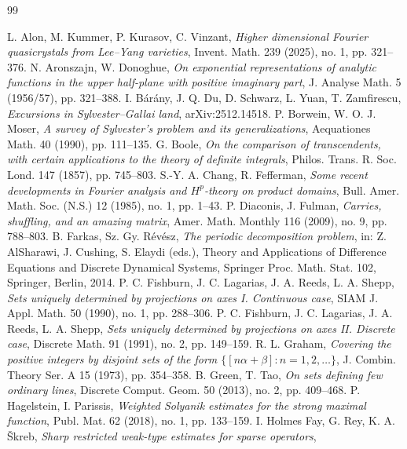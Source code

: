 \documentclass{article}
\begin{document}
	\begin{thebibliography}{99}

		{L. Alon, M. Kummer, P. Kurasov, C. Vinzant},
		{\it Higher dimensional Fourier quasicrystals from Lee--Yang varieties},
		Invent. Math. 239 (2025), no. 1, pp. 321--376.
		{N. Aronszajn, W. Donoghue},
		{\it On exponential representations of analytic functions in the upper half-plane with positive imaginary part},
		J. Analyse Math. 5 (1956/57), pp. 321--388.
		{I. B\'ar\'any, J. Q. Du, D. Schwarz, L. Yuan, T. Zamfirescu},
		{\it Excursions in Sylvester--Gallai land},
		arXiv:2512.14518.
		{P. Borwein, W. O. J. Moser},
		{\it A survey of Sylvester's problem and its generalizations},
		Aequationes Math. 40 (1990), pp. 111--135.
		{G. Boole},
		{\it On the comparison of transcendents, with certain applications to the theory of definite integrals},
		Philos. Trans. R. Soc. Lond. 147 (1857), pp. 745--803.
		{S.-Y. A. Chang, R. Fefferman},
		{\it Some recent developments in Fourier analysis and $H^p$-theory on product domains},
		Bull. Amer. Math. Soc. (N.S.) 12 (1985), no. 1, pp. 1--43.
		{P. Diaconis, J. Fulman},
		{\it Carries, shuffling, and an amazing matrix},
		Amer. Math. Monthly 116 (2009), no. 9, pp. 788--803.
		{B. Farkas, Sz. Gy. R\'ev\'esz},
		{\it The periodic decomposition problem},
		in: Z. AlSharawi, J. Cushing, S. Elaydi (eds.), Theory and Applications of Difference Equations and Discrete Dynamical Systems, Springer Proc. Math. Stat. 102, Springer, Berlin, 2014.
		{P. C. Fishburn, J. C. Lagarias, J. A. Reeds, L. A. Shepp},
		{\it Sets uniquely determined by projections on axes I. Continuous case},
		SIAM J. Appl. Math. 50 (1990), no. 1, pp. 288--306.
		{P. C. Fishburn, J. C. Lagarias, J. A. Reeds, L. A. Shepp},
		{\it Sets uniquely determined by projections on axes II. Discrete case},
		Discrete Math. 91 (1991), no. 2, pp. 149--159.
		{R. L. Graham},
		{\it Covering the positive integers by disjoint sets of the form $\{[n\alpha+\beta]: n=1,2,\dots\}$},
		J. Combin. Theory Ser. A 15 (1973), pp. 354--358.
		{B. Green, T. Tao},
		{\it On sets defining few ordinary lines},
		Discrete Comput. Geom. 50 (2013), no. 2, pp. 409--468.
		{P. Hagelstein, I. Parissis},
		{\it Weighted Solyanik estimates for the strong maximal function},
		Publ. Mat. 62 (2018), no. 1, pp. 133--159.
		{I. Holmes Fay, G. Rey, K. A. \v{S}kreb},
		{\it Sharp restricted weak-type estimates for sparse operators},

\end{thebibliography}
\end{document}
